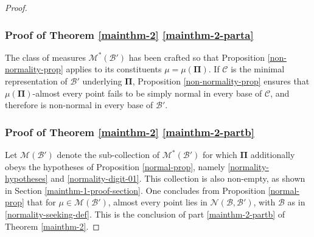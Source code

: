 \documentclass[12pt, twoside]{article}
\theoremstyle{definition}
\numberwithin{equation}{section}
\begin{document}
\begin{proof}
\subsubsection{Proof of Theorem \ref{mainthm-2} \eqref{mainthm-2-parta}} 
The class of measures $\mathscr{M}^{\ast}(\mathscr{B}')$ has been crafted so that Proposition \ref{non-normality-prop} applies to its constituents $\mu = \mu(\pmb{\Pi})$. If $\mathscr{C}$ is the minimal representation of $\mathscr{B}'$ underlying $\pmb{\Pi}$, 
Proposition \ref{non-normality-prop} ensures that $\mu(\pmb{\Pi})$-almost every point fails to be simply normal in every base of $\mathscr{C}$, and therefore is non-normal in every base of $\mathscr{B}'$.  

\subsubsection{Proof of Theorem \ref{mainthm-2} \eqref{mainthm-2-partb}}
 Let $\mathscr{M}(\mathscr{B}')$ denote the sub-collection of $\mathscr{M}^{\ast}(\mathscr{B}')$ for which $\pmb{\Pi}$ additionally obeys the hypotheses of Proposition \ref{normal-prop}, namely \eqref{normality-hypotheses} and \eqref{normality-digit-01}. This collection is also non-empty, as shown in Section \ref{mainthm-1-proof-section}. One concludes from Proposition \ref{normal-prop} that for $\mu \in \mathscr{M}(\mathscr{B}')$, almost every point lies in $\mathscr{N}(\mathscr{B}, \mathscr{B}')$, with $\mathscr{B}$ as in \eqref{normality-seeking-def}. This is the conclusion of part \eqref{mainthm-2-partb} of Theorem \ref{mainthm-2}.


\end{proof}
\end{document}
